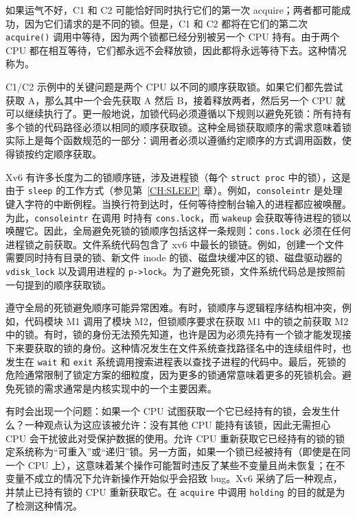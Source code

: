 如果运气不好，C1 和 C2 可能恰好同时执行它们的第一次 acquire；两者都可能成功，因为它们请求的是不同的锁。但是，C1 和 C2 都将在它们的第二次 {\tt acquire()} 调用中等待，因为两个锁都已经分别被另一个 CPU 持有。由于两个 CPU 都在相互等待，它们都永远不会释放锁，因此都将永远等待下去。这种情况称为。

C1/C2 示例中的关键问题是两个 CPU 以不同的顺序获取锁。如果它们都先尝试获取 A，那么其中一个会先获取 A 然后 B，接着释放两者，然后另一个 CPU 就可以继续执行了。更一般地说，加锁代码必须遵循以下规则以避免死锁：所有持有多个锁的代码路径必须以相同的顺序获取锁。这种全局锁获取顺序的需求意味着锁实际上是每个函数规范的一部分：调用者必须以遵循约定顺序的方式调用函数，使得锁按约定顺序获取。

Xv6 有许多长度为二的锁顺序链，涉及进程锁（每个 \lstinline{struct proc} 中的锁），这是由于 \lstinline{sleep} 的工作方式（参见第~\ref{CH:SLEEP} 章）。例如，\lstinline{consoleintr}  是处理键入字符的中断例程。当换行符到达时，任何等待控制台输入的进程都应被唤醒。为此，\lstinline{consoleintr} 在调用  时持有 \lstinline{cons.lock}，而 \lstinline{wakeup} 会获取等待进程的锁以唤醒它。因此，全局避免死锁的锁顺序包括这样一条规则：\lstinline{cons.lock} 必须在任何进程锁之前获取。文件系统代码包含了 xv6 中最长的锁链。例如，创建一个文件需要同时持有目录的锁、新文件 inode 的锁、磁盘块缓冲区的锁、磁盘驱动器的 \lstinline{vdisk_lock} 以及调用进程的 \lstinline{p->lock}。为了避免死锁，文件系统代码总是按照前一句提到的顺序获取锁。

遵守全局的死锁避免顺序可能异常困难。有时，锁顺序与逻辑程序结构相冲突，例如，代码模块 M1 调用了模块 M2，但锁顺序要求在获取 M1 中的锁之前获取 M2 中的锁。有时，锁的身份无法预先知道，也许是因为必须先持有一个锁才能发现接下来要获取的锁的身份。这种情况发生在文件系统查找路径名中的连续组件时，也发生在 {\tt wait} 和 {\tt exit} 系统调用搜索进程表以查找子进程的代码中。最后，死锁的危险通常限制了锁定方案的细粒度，因为更多的锁通常意味着更多的死锁机会。避免死锁的需求通常是内核实现中的一个主要因素。

有时会出现一个问题：如果一个 CPU 试图获取一个它已经持有的锁，会发生什么？一种观点认为这应该被允许：没有其他 CPU 能持有该锁，因此无需担心 CPU 会干扰彼此对受保护数据的使用。允许 CPU 重新获取它已经持有的锁的锁定系统称为“可重入”或“递归”锁。另一方面，如果一个锁已经被持有（即使是在同一个 CPU 上），这意味着某个操作可能暂时违反了某些不变量且尚未恢复；在不变量不成立的情况下允许新操作开始似乎会招致 bug。Xv6 采纳了后一种观点，并禁止已持有锁的 CPU 重新获取它。在 {\tt acquire} 中调用 {\tt holding} 的目的就是为了检测这种情况。

